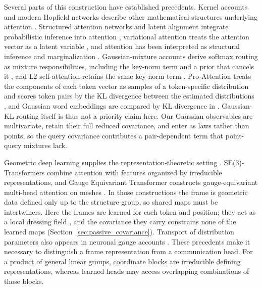\documentclass[twoside,11pt]{article}
\begin{document}
Several parts of this construction have established precedents. Kernel accounts and modern Hopfield networks describe other mathematical structures underlying attention \citep{tsai2019transformer,katharopoulos2020transformers,ramsauer2021hopfield}. Structured attention networks and latent alignment integrate probabilistic inference into attention \citep{Kim2017StructuredAttention,Deng2018LatentAlignment}, variational attention treats the attention vector as a latent variable \citep{Bahuleyan2018VariationalAttention}, and attention has been interpreted as structural inference and marginalization \citep{Singh2023ImplicitStructuralInference,Singh2023MarginalProbability}. Gaussian-mixture accounts derive softmax routing as mixture responsibilities, including the key-norm term and a prior that cancels it \citep{Movellan2020ProbabilisticTransformers,Gabbur2021ProbabilisticAttention,Nguyen2022MGK}, and L2 self-attention retains the same key-norm term \citep{Kim2021Lipschitz}. Pro-Attention treats the components of each token vector as samples of a token-specific distribution and scores token pairs by the KL divergence between the estimated distributions \citep{Bae2022ProAttention}, and Gaussian word embeddings are compared by KL divergence in \citet{Vilnis2015Gaussian}. Gaussian-KL routing itself is thus not a priority claim here. Our Gaussian observables are multivariate, retain their full reduced covariance, and enter as laws rather than points, so the query covariance contributes a pair-dependent term that point-query mixtures lack.

Geometric deep learning supplies the representation-theoretic setting \citep{cohen2019gauge,bronstein2021geometric}. SE(3)-Transformers combine attention with features organized by irreducible representations, and Gauge Equivariant Transformer constructs gauge-equivariant multi-head attention on meshes \citep{fuchs2020se3,He2021GaugeEquivariantTransformer}. In those constructions the frame is geometric data defined only up to the structure group, so shared maps must be intertwiners. Here the frames are learned for each token and position; they act as a local dressing field \citep{Fournel2014Dressing,Francois2019Artificial}, and the covariance they carry constrains none of the learned maps (Section~\ref{sec:passive_covariance}). Transport of distribution parameters also appears in neuronal gauge accounts \citep{Sengupta2016NeuronalGauge,sengupta2017gauge}. These precedents make it necessary to distinguish a frame representation from a communication head. For a product of general linear groups, coordinate blocks are irreducible defining representations, whereas learned heads may access overlapping combinations of those blocks.
\end{document}
